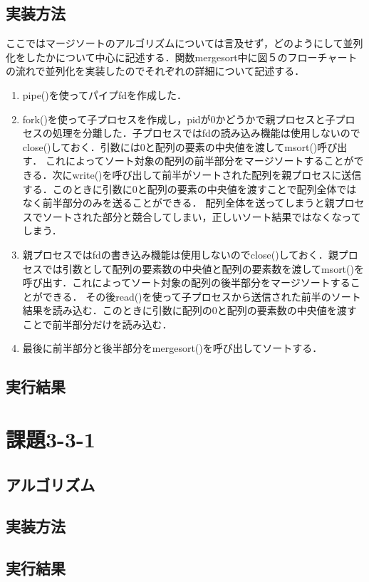 \documentclass[dvipdfmx]{jarticle}
\begin{document}
\subsection{実装方法}
ここではマージソートのアルゴリズムについては言及せず，どのようにして並列化をしたかについて中心に記述する．関数mergesort中に図５のフローチャートの流れで並列化を実装したのでそれぞれの詳細について記述する．
\begin{enumerate}
    \item pipe()を使ってパイプfdを作成した．
    \item fork()を使って子プロセスを作成し，pidが0かどうかで親プロセスと子プロセスの処理を分離した．子プロセスではfdの読み込み機能は使用しないのでclose()しておく．引数には0と配列の要素の中央値を渡してmsort()呼び出す．
    これによってソート対象の配列の前半部分をマージソートすることができる．次にwrite()を呼び出して前半がソートされた配列を親プロセスに送信する．このときに引数に0と配列の要素の中央値を渡すことで配列全体ではなく前半部分のみを送ることができる．
    配列全体を送ってしまうと親プロセスでソートされた部分と競合してしまい，正しいソート結果ではなくなってしまう．
    \item 親プロセスではfdの書き込み機能は使用しないのでclose()しておく．親プロセスでは引数として配列の要素数の中央値と配列の要素数を渡してmsort()を呼び出す．これによってソート対象の配列の後半部分をマージソートすることができる．
    その後read()を使って子プロセスから送信された前半のソート結果を読み込む．このときに引数に配列の0と配列の要素数の中央値を渡すことで前半部分だけを読み込む．
    \item 最後に前半部分と後半部分をmergesort()を呼び出してソートする．
\end{enumerate}
\subsection{実行結果}
\section{課題3-3-1}
\subsection{アルゴリズム}

\subsection{実装方法}
\subsection{実行結果}
\end{document}
